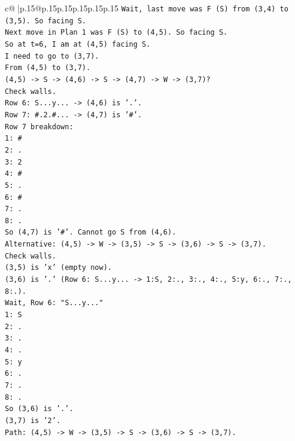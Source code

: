 \documentclass{article}
\begin{document}
{\begin{supertabular}{c@{$\;$}|p{.15\linewidth}@{}p{.15\linewidth}p{.15\linewidth}p{.15\linewidth}p{.15\linewidth}p{.15\linewidth}}
{{{\texttt{Wait, last move was F (S) from (3,4) to (3,5). So facing S.} \\
\texttt{Next move in Plan 1 was F (S) to (4,5). So facing S.} \\
\texttt{So at t=6, I am at (4,5) facing S.} \\
\texttt{I need to go to (3,7).} \\
\texttt{From (4,5) to (3,7).} \\
\texttt{(4,5) {-}> S {-}> (4,6) {-}> S {-}> (4,7) {-}> W {-}> (3,7)?} \\
\texttt{Check walls.} \\
\texttt{Row 6: S...y... {-}> (4,6) is '.'.} \\
\texttt{Row 7: \#.2.\#... {-}> (4,7) is '\#'.} \\
\texttt{Row 7 breakdown:} \\
\texttt{1: \#} \\
\texttt{2: .} \\
\texttt{3: 2} \\
\texttt{4: \#} \\
\texttt{5: .} \\
\texttt{6: \#} \\
\texttt{7: .} \\
\texttt{8: .} \\
\texttt{So (4,7) is '\#'. Cannot go S from (4,6).} \\
\texttt{Alternative: (4,5) {-}> W {-}> (3,5) {-}> S {-}> (3,6) {-}> S {-}> (3,7).} \\
\texttt{Check walls.} \\
\texttt{(3,5) is 'x' (empty now).} \\
\texttt{(3,6) is '.' (Row 6: S...y... {-}> 1:S, 2:., 3:., 4:., 5:y, 6:., 7:., 8:.).} \\
\texttt{Wait, Row 6: "S...y..."} \\
\texttt{1: S} \\
\texttt{2: .} \\
\texttt{3: .} \\
\texttt{4: .} \\
\texttt{5: y} \\
\texttt{6: .} \\
\texttt{7: .} \\
\texttt{8: .} \\
\texttt{So (3,6) is '.'.} \\
\texttt{(3,7) is '2'.} \\
\texttt{Path: (4,5) {-}> W {-}> (3,5) {-}> S {-}> (3,6) {-}> S {-}> (3,7).} \\
}}}
\end{supertabular}}
\end{document}
